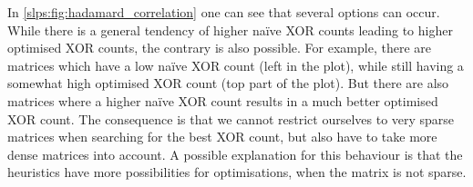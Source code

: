 
In \cref{slps:fig:hadamard_correlation} one can see that several options can occur.
While there is a general tendency of higher na\"ive XOR counts leading to higher optimised XOR counts, the contrary is also possible.
For example, there are matrices which have a low na\"ive XOR count (left in the plot), while still having a somewhat high optimised XOR count (top part of the plot).
But there are also matrices where a higher na\"ive XOR count results in a much better optimised XOR count.
The consequence is that we cannot restrict ourselves to very sparse matrices when searching for the best XOR count, but also have to take more dense matrices into account.
A possible explanation for this behaviour is that the heuristics have more possibilities for optimisations, when the matrix is not sparse.

